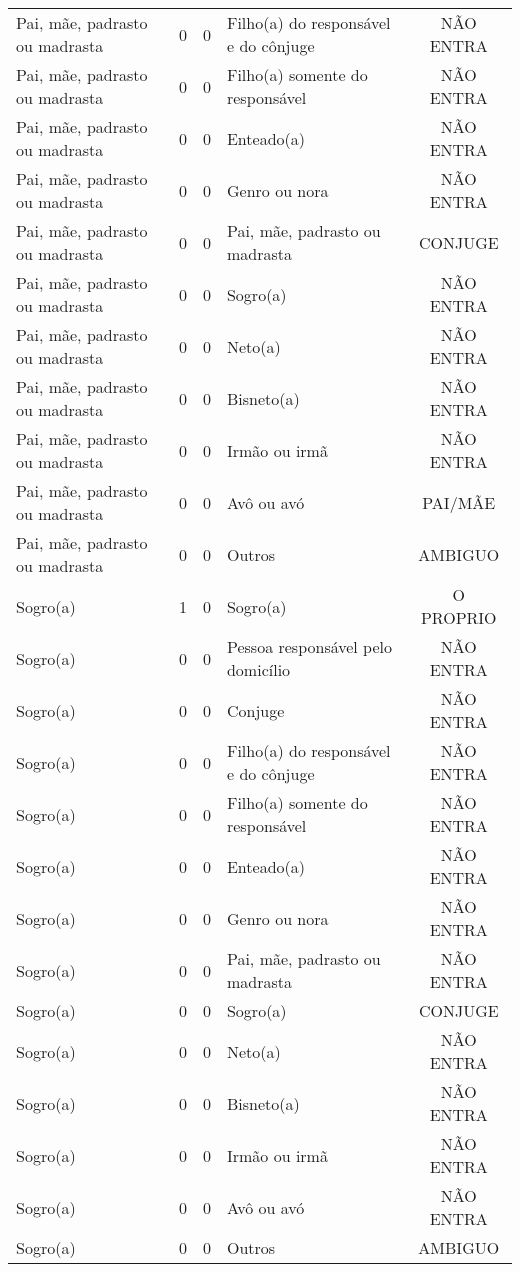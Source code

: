 \documentclass[
	12pt,				%
	openright,			%
	twoside,			%
	a4paper,			%
	english,			%
	french,				%
	spanish,			%
	brazil				%
	]{abntex2}
\begin{document}
\begin{anexosenv}
\begin{longtable}{@{}lcclc@{}}
				Pai, mãe, padrasto ou madrasta & 0 & 0 & Filho(a) do responsável e do cônjuge & NÃO ENTRA \\
				Pai, mãe, padrasto ou madrasta & 0 & 0 & Filho(a) somente do responsável & NÃO ENTRA \\
				Pai, mãe, padrasto ou madrasta & 0 & 0 & Enteado(a) & NÃO ENTRA \\
				Pai, mãe, padrasto ou madrasta & 0 & 0 & Genro ou nora & NÃO ENTRA \\
				Pai, mãe, padrasto ou madrasta & 0 & 0 & Pai, mãe, padrasto ou madrasta & CONJUGE \\
				Pai, mãe, padrasto ou madrasta & 0 & 0 & Sogro(a) & NÃO ENTRA \\
				Pai, mãe, padrasto ou madrasta & 0 & 0 & Neto(a) & NÃO ENTRA \\
				Pai, mãe, padrasto ou madrasta & 0 & 0 & Bisneto(a) & NÃO ENTRA \\
				Pai, mãe, padrasto ou madrasta & 0 & 0 & Irmão ou irmã & NÃO ENTRA \\
				Pai, mãe, padrasto ou madrasta & 0 & 0 & Avô ou avó & PAI/MÃE \\
				Pai, mãe, padrasto ou madrasta & 0 & 0 & Outros & AMBIGUO \\
				Sogro(a) & 1 & 0 & Sogro(a) & O PROPRIO \\
				Sogro(a) & 0 & 0 & Pessoa responsável pelo domicílio & NÃO ENTRA \\
				Sogro(a) & 0 & 0 & Conjuge & NÃO ENTRA \\
				Sogro(a) & 0 & 0 & Filho(a) do responsável e do cônjuge & NÃO ENTRA \\
				Sogro(a) & 0 & 0 & Filho(a) somente do responsável & NÃO ENTRA \\
				Sogro(a) & 0 & 0 & Enteado(a) & NÃO ENTRA \\
				Sogro(a) & 0 & 0 & Genro ou nora & NÃO ENTRA \\
				Sogro(a) & 0 & 0 & Pai, mãe, padrasto ou madrasta & NÃO ENTRA \\
				Sogro(a) & 0 & 0 & Sogro(a) & CONJUGE \\
				Sogro(a) & 0 & 0 & Neto(a) & NÃO ENTRA \\
				Sogro(a) & 0 & 0 & Bisneto(a) & NÃO ENTRA \\
				Sogro(a) & 0 & 0 & Irmão ou irmã & NÃO ENTRA \\
				Sogro(a) & 0 & 0 & Avô ou avó & NÃO ENTRA \\
				Sogro(a) & 0 & 0 & Outros & AMBIGUO \\

\end{longtable}
\end{anexosenv}
\end{document}
